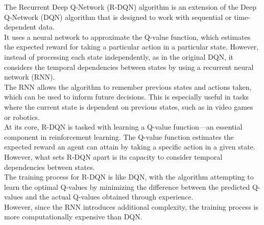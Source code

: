 \documentclass[preprint,12pt]{elsarticle}
\begin{document}
The Recurrent Deep Q-Network (R-DQN) algorithm is an extension of the Deep Q-Network (DQN) algorithm that is designed to work with sequential or time-dependent data.\\
It uses a neural network to approximate the Q-value function, which estimates the expected reward for taking a particular action in a particular state. However, instead of processing each state independently, as in the original DQN, it considers the temporal dependencies between states by using a recurrent neural network (RNN).\\
The RNN allows the algorithm to remember previous states and actions taken, which can be used to inform future decisions. This is especially useful in tasks where the current state is dependent on previous states, such as in video games or robotics.\\
At its core, R-DQN is tasked with learning a Q-value function—an essential component in reinforcement learning. The Q-value function estimates the expected reward an agent can attain by taking a specific action in a given state. However, what sets R-DQN apart is its capacity to consider temporal dependencies between states. \\
The training process for R-DQN is like DQN, with the algorithm attempting to learn the optimal Q-values by minimizing the difference between the predicted Q-values and the actual Q-values obtained through experience.\\
However, since the RNN introduces additional complexity, the training process is more computationally expensive than DQN.\\
\end{document}
